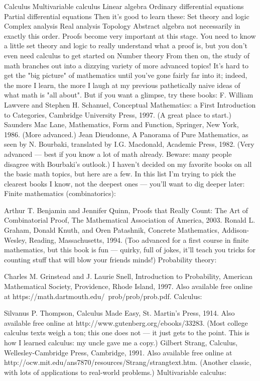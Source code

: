 \documentclass[10pt,a4paper]{book}
\theoremstyle{definition}
\begin{document}
Calculus
Multivariable calculus
Linear algebra
Ordinary differential equations
Partial differential equations
Then it's good to learn these:
Set theory and logic
Complex analysis
Real analysis
Topology
Abstract algebra
not necessarily in exactly this order. Proofs become very important at this stage. You need to know a little set theory and logic to really understand what a proof is, but you don't even need calculus to get started on
Number theory
From then on, the study of math branches out into a dizzying variety of more advanced topics! It's hard to get the "big picture" of mathematics until you've gone fairly far into it; indeed, the more I learn, the more I laugh at my previous pathetically naive ideas of what math is "all about". But if you want a glimpse, try these books:
F. William Lawvere and Stephen H. Schanuel, Conceptual Mathematics: a First Introduction to Categories, Cambridge University Press, 1997. (A great place to start.)
Saunders Mac Lane, Mathematics, Form and Function, Springer, New York, 1986. (More advanced.)
Jean Dieudonne, A Panorama of Pure Mathematics, as seen by N. Bourbaki, translated by I.G. Macdonald, Academic Press, 1982. (Very advanced — best if you know a lot of math already. Beware: many people disagree with Bourbaki's outlook.)
I haven't decided on my favorite books on all the basic math topics, but here are a few. In this list I'm trying to pick the clearest books I know, not the deepest ones — you'll want to dig deeper later:
Finite mathematics (combinatorics):

Arthur T. Benjamin and Jennifer Quinn, Proofs that Really Count: The Art of Combinatorial Proof, The Mathematical Association of America, 2003.
Ronald L. Graham, Donald Knuth, and Oren Patashnik, Concrete Mathematics, Addison-Wesley, Reading, Massachusetts, 1994. (Too advanced for a first course in finite mathematics, but this book is fun — quirky, full of jokes, it'll teach you tricks for counting stuff that will blow your friends minds!)
Probability theory:

Charles M. Grinstead and J. Laurie Snell, Introduction to Probability, American Mathematical Society, Providence, Rhode Island, 1997. Also available free online at https://math.dartmouth.edu/~prob/prob/prob.pdf.
Calculus:

Silvanus P. Thompson, Calculus Made Easy, St. Martin's Press, 1914. Also available free online at http://www.gutenberg.org/ebooks/33283. (Most college calculus texts weigh a ton; this one does not — it just gets to the point. This is how I learned calculus: my uncle gave me a copy.)
Gilbert Strang, Calculus, Wellesley-Cambridge Press, Cambridge, 1991. Also available free online at http://ocw.mit.edu/ans7870/resources/Strang/strangtext.htm. (Another classic, with lots of applications to real-world problems.)
Multivariable calculus:
\end{document}
